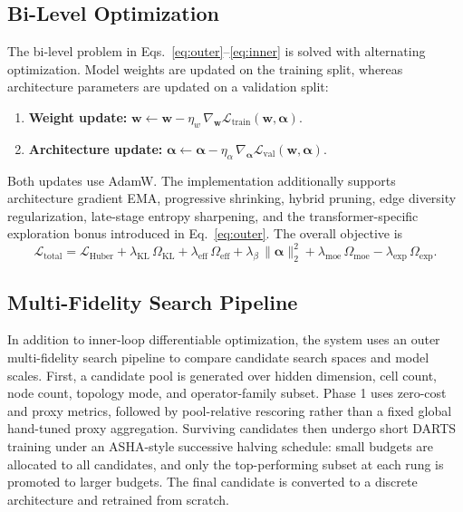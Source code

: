 \subsection{Bi-Level Optimization}
\label{sec:bilevel}

The bi-level problem in Eqs.~\eqref{eq:outer}--\eqref{eq:inner} is solved with
alternating optimization. Model weights are updated on the training split,
whereas architecture parameters are updated on a validation split:
%
\begin{enumerate}[nosep]
    \item \textbf{Weight update:}
          $\boldsymbol{w} \leftarrow \boldsymbol{w} -
          \eta_w\,\nabla_{\boldsymbol{w}}
          \mathcal{L}_{\mathrm{train}}(\boldsymbol{w},\boldsymbol{\alpha})$.
    \item \textbf{Architecture update:}
          $\boldsymbol{\alpha} \leftarrow \boldsymbol{\alpha} -
          \eta_{\alpha}\,\nabla_{\boldsymbol{\alpha}}
          \mathcal{L}_{\mathrm{val}}(\boldsymbol{w},\boldsymbol{\alpha})$.
\end{enumerate}
%
Both updates use AdamW. The implementation additionally supports architecture
gradient EMA, progressive shrinking, hybrid pruning, edge diversity
regularization, late-stage entropy sharpening, and the transformer-specific
exploration bonus introduced in Eq.~\eqref{eq:outer}. The overall objective is
%
\begin{equation}
    \mathcal{L}_{\mathrm{total}} =
      \mathcal{L}_{\mathrm{Huber}}
      + \lambda_{\mathrm{KL}}\,\Omega_{\mathrm{KL}}
      + \lambda_{\mathrm{eff}}\,\Omega_{\mathrm{eff}}
      + \lambda_{\beta}\,\lVert \boldsymbol{\alpha} \rVert_2^2
      + \lambda_{\mathrm{moe}}\,\Omega_{\mathrm{moe}}
      - \lambda_{\mathrm{exp}}\,\Omega_{\mathrm{exp}}.
    \label{eq:total_loss}
\end{equation}

\subsection{Multi-Fidelity Search Pipeline}
\label{sec:multifidelity}

In addition to inner-loop differentiable optimization, the system uses an
outer multi-fidelity search pipeline to compare candidate search spaces and
model scales. First, a candidate pool is generated over hidden dimension,
cell count, node count, topology mode, and operator-family subset. Phase 1
uses zero-cost and proxy metrics, followed by pool-relative rescoring rather
than a fixed global hand-tuned proxy aggregation. Surviving candidates then
undergo short DARTS training under an ASHA-style successive halving schedule:
small budgets are allocated to all candidates, and only the top-performing
subset at each rung is promoted to larger budgets. The final candidate is
converted to a discrete architecture and retrained from scratch.

